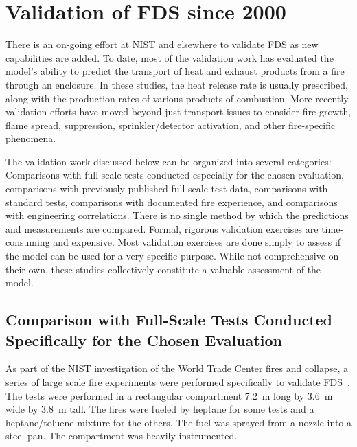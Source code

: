 \section{Validation of FDS since 2000}

There is an  on-going effort at NIST and elsewhere  to validate FDS as new capabilities are  added. To date, most of  the validation work has
evaluated the  model's ability  to predict the  transport of  heat and exhaust products from  a fire through an enclosure.  In these studies, the
heat release rate is usually prescribed, along with the production rates of  various products  of combustion.  More  recently, validation efforts
have moved  beyond  just transport  issues  to consider  fire growth, flame spread,  suppression, sprinkler/detector activation, and other
fire-specific phenomena.

The  validation work  discussed below  can be  organized  into several categories: Comparisons with full-scale tests conducted especially for the
chosen  evaluation,   comparisons   with  previously   published full-scale  test data,  comparisons with  standard  tests, comparisons with
documented  fire experience,  and  comparisons with  engineering correlations.  There is no single  method by which the predictions and measurements
are compared.   Formal, rigorous validation exercises are time-consuming  and  expensive.  Most  validation exercises  are  done simply to assess if
the model can be used for a very specific purpose. While  not  comprehensive on  their  own,  these studies  collectively constitute a valuable
assessment of the model.


\subsection{Comparison with Full-Scale Tests Conducted Specifically for the Chosen Evaluation}

As part of the NIST investigation  of the World Trade Center fires and collapse,  a series  of large  scale fire  experiments  were performed
specifically  to  validate  FDS~\cite{Hamins:WTC1}.   The  tests  were performed in  a rectangular  compartment 7.2~m long  by 3.6~m  wide by 3.8~m
tall.   The fires were  fueled by heptane  for some tests  and a heptane/toluene mixture  for the others.  The fuel was sprayed  from a nozzle into a
steel pan. The compartment was heavily instrumented.

